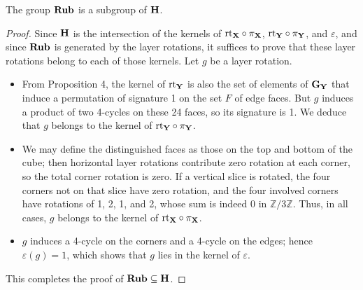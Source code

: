 \begin{proposition}
    \label{prop:RubSubH}
    The group $\mathbf{Rub}$ is a subgroup of $\mathbf{H}$.
\end{proposition}
\begin{proof}
    Since $\mathbf{H}$ is the intersection of the kernels of
    $\mathrm{rt}_{\mathbf{X}} \circ \pi_{\mathbf{X}}$, $\mathrm{rt}_{\mathbf{Y}} \circ \pi_{\mathbf{Y}}$, and $\varepsilon$,
    and since $\mathbf{Rub}$ is generated by the layer rotations, it suffices to prove that these layer rotations belong to each of those kernels.
    Let $g$ be a layer rotation.

    \begin{itemize}
        \item From Proposition 4, the kernel of $\mathrm{rt}_{\mathbf{Y}}$ is also the set of elements of $\mathbf{G}_{\mathbf{Y}}$ that induce a permutation of signature 1 on the set $F$ of edge faces.
        But $g$ induces a product of two 4-cycles on these 24 faces, so its signature is 1.
        We deduce that $g$ belongs to the kernel of $\mathrm{rt}_{\mathbf{Y}} \circ \pi_{\mathbf{Y}}$.
        \item We may define the distinguished faces as those on the top and bottom of the cube;
        then horizontal layer rotations contribute zero rotation at each corner, so the total corner rotation is zero.
        If a vertical slice is rotated, the four corners not on that slice have zero rotation,
        and the four involved corners have rotations of 1, 2, 1, and 2, whose sum is indeed 0 in $\mathbb{Z}/3\mathbb{Z}$.
        Thus, in all cases, $g$ belongs to the kernel of $\mathrm{rt}_{\mathbf{X}} \circ \pi_{\mathbf{X}}$.
        \item $g$ induces a 4-cycle on the corners and a 4-cycle on the edges; hence $\varepsilon(g) = 1$, which shows that $g$ lies in the kernel of $\varepsilon$.
    \end{itemize}
    This completes the proof of $\mathbf{Rub} \subseteq \mathbf{H}$.
\end{proof}
